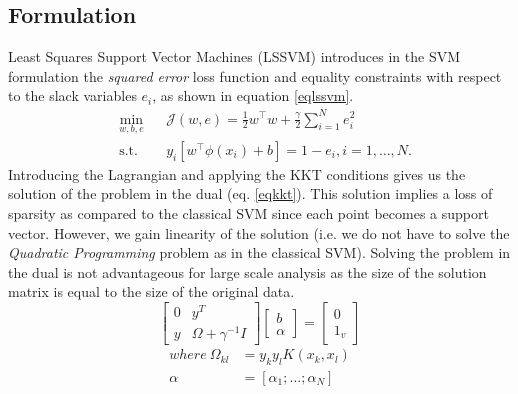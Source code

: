 \documentclass[conference, cmex10]{IEEEtran}
\begin{document}
\subsection{Formulation}
Least Squares Support Vector Machines (LSSVM) \cite{lssvmbook} \cite{Suykens1999} introduces in the SVM formulation the \textit{squared error} loss function and equality constraints with respect to the slack variables $e_i$, as shown in equation \ref{eqlssvm}. 
\begin{equation}\label{eqlssvm}
\begin{aligned}
& \underset{w,b,e}{\text{min}}
& & \mathcal{J}(w,e) = \frac{1}{2}w^{\intercal}w + \frac{\gamma}{2}\sum\limits_{i=1}^N e_{i}^2 \\
& \text{s.t.}
& & y_{i}[ w^{\intercal}\phi(x_{i})+b ] = 1 - e_{i}, i=1,\ldots ,N.
\end{aligned}
\end{equation}
Introducing the Lagrangian and applying the KKT conditions gives us the solution of the problem in the dual (eq. \ref{eqkkt}). This solution implies a loss of sparsity as compared to the classical SVM since each point becomes a support vector. However, we gain linearity of the solution (i.e. we do not have to solve the \textit{Quadratic Programming} problem as in the classical SVM). Solving the problem in the dual is not advantageous for large scale analysis as the size of the solution matrix is equal to the size of the original data.  
\begin{equation}
\label{eqkkt}
\left[\begin{array}{c|c}
   0  & y^T   \\ \hline
   y & \Omega + \gamma^{-1} \mathit{I} 
\end{array}\right] 
\left[\begin{array}{c}
   b    \\ \hline
   \alpha  
\end{array}\right] = \left[\begin{array}{c}
   0    \\ \hline
   1_v  
\end{array}\right] 
\end{equation}
\begin{align*}
\mathit{where} \ \Omega_{kl} &= y_{k}y_{l}K(x_{k}, x_{l}) \\
\alpha &= \left[\alpha_1 ; ... ; \alpha_N \right]
\end{align*}
\end{document}
